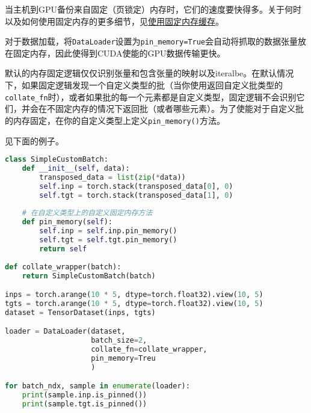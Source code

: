 \documentclass[../main.tex]{subfile}
\begin{document}
当主机到GPU备份来自固定（页锁定）内存时，它们的速度要快得多。关于何时以及如何使用固定内存的更多细节，见\href{https://pytorch.org/docs/stable/notes/cuda.html#cuda-memory-pinning}{使用固定内存缓存}。

对于数据加载，将\lstinline{DataLoader}设置为\lstinline{pin_memory=True}会自动将抓取的数据张量放在固定内存，因此使得到CUDA使能的GPU数据传输更快。

默认的内存固定逻辑仅仅识别张量和包含张量的映射以及iteralbe。在默认情况下，如果固定逻辑发现一个自定义类型的批（当你使用返回自定义批类型的\lstinline{collate_fn}时），或者如果批的每一个元素都是自定义类型，固定逻辑不会识别它们，并会在不固定内存的情况下返回批（或者哪些元素）。为了使能对于自定义批的内存固定，在你的自定义类型上定义\lstinline{pin_memory()}方法。

见下面的例子。

\begin{lstlisting}[language=Python]
class SimpleCustomBatch:
    def __init__(self, data):
        transposed_data = list(zip(*data))
        self.inp = torch.stack(transposed_data[0], 0)
        self.tgt = torch.stack(transposed_data[1], 0)
    
    # 在自定义类型上的自定义固定内存方法
    def pin_memory(self):
        self.inp = self.inp.pin_memory()
        self.tgt = self.tgt.pin_memory()
        return self
    
def collate_wrapper(batch):
    return SimpleCustomBatch(batch)

inps = torch.arange(10 * 5, dtype=torch.float32).view(10, 5)
tgts = torch.arange(10 * 5, dtype=torch.float32).view(10, 5)
dataset = TensorDataset(inps, tgts)

loader = DataLoader(dataset, 
                    batch_size=2, 
                    collate_fn=collate_wrapper, 
                    pin_memory=Treu
                    )

for batch_ndx, sample in enumerate(loader):
    print(sample.inp.is_pinned())
    print(sample.tgt.is_pinned())
\end{lstlisting}
\end{document}
